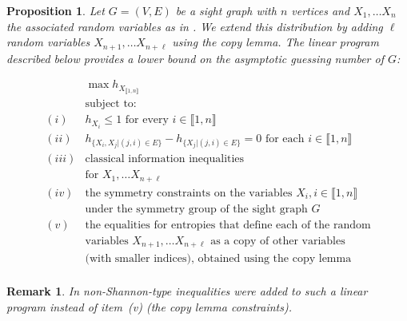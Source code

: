 \documentclass[11pt, a4paper]{kybernetika}
\newtheorem{proposition}[theorem]{Proposition}
\newtheorem{remark}[theorem]{Remark}
\begin{document}
	\begin{proposition}\label{p:linear-program-for-number}
		Let $G=(V,E)$ be a sight graph with $n$ vertices and $X_1,\ldots X_n$ the associated random variables as in \cite{christofides2011guessing}. We extend this distribution by adding $\ell$ random variables $X_{n+1},\ldots X_{n+\ell}$ using the copy lemma.
		The linear program described below provides a lower bound on the asymptotic guessing number of $G$:
		
		$$
		\begin{array}{ll}
			&\max h_{X_{\llbracket1,n\rrbracket}}\\
			&\text{subject to:}\\
			(i)&h_{X_i}\le1\text{ for every } i\in\llbracket1,n\rrbracket\\
			(ii)&h_{\{X_i,X_j|(j,i)\in E\}}-h_{\{X_j|(j,i)\in E\}}=0\text{ for each }i\in\llbracket1,n\rrbracket\\
			(iii)&\text{classical information inequalities}\\&\text{for }X_1,\ldots X_{n+\ell}\\
			(iv)&\text{the symmetry constraints on the variables }X_i,i\in\llbracket1,n\rrbracket\\
			&\text{under the symmetry group of the sight graph }G\\
			(v)&\text{the equalities for entropies that define each of the random}\\
			&\text{variables }X_{n+1},\ldots X_{n+\ell}\text{ as a copy of other variables}\\
			&\text{(with smaller indices), obtained using the copy lemma}\\
		\end{array}
		$$
	\end{proposition}
	\begin{remark}
		In \cite{baber2016graph} non-Shannon-type inequalities were added to such a linear program instead of item~(v) (the copy lemma constraints).
	\end{remark}
\end{document}
